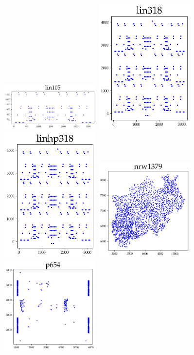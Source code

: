 \begin{appendices}
\begin{figure}[H]
\centering
\includegraphics[width=5cm]{../tsplib_euc2d_pictures_of_instances/lin105.png}
\includegraphics[width=5cm]{../tsplib_euc2d_pictures_of_instances/lin318.png}
\includegraphics[width=5cm]{../tsplib_euc2d_pictures_of_instances/linhp318.png}
\includegraphics[width=5cm]{../tsplib_euc2d_pictures_of_instances/nrw1379.png}
\includegraphics[width=5cm]{../tsplib_euc2d_pictures_of_instances/p654.png}

\end{figure}
\end{appendices}
